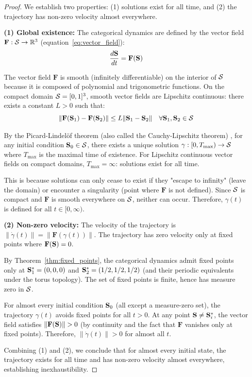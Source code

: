 \begin{proof}
We establish two properties: (1) solutions exist for all time, and (2) the trajectory has non-zero velocity almost everywhere.

\textbf{(1) Global existence:} The categorical dynamics are defined by the vector field $\mathbf{F}: \mathcal{S} \to \mathbb{R}^3$ (equation~\eqref{eq:vector_field}):
\begin{equation}
\frac{d\mathbf{S}}{dt} = \mathbf{F}(\mathbf{S})
\end{equation}

The vector field $\mathbf{F}$ is smooth (infinitely differentiable) on the interior of $\mathcal{S}$ because it is composed of polynomial and trigonometric functions. On the compact domain $\mathcal{S} = [0,1]^3$, smooth vector fields are Lipschitz continuous: there exists a constant $L > 0$ such that:
\begin{equation}
\|\mathbf{F}(\mathbf{S}_1) - \mathbf{F}(\mathbf{S}_2)\| \leq L \|\mathbf{S}_1 - \mathbf{S}_2\| \quad \forall \mathbf{S}_1, \mathbf{S}_2 \in \mathcal{S}
\end{equation}

By the Picard-Lindelöf theorem (also called the Cauchy-Lipschitz theorem) \citep{arnold1989mathematical}, for any initial condition $\mathbf{S}_0 \in \mathcal{S}$, there exists a unique solution $\gamma: [0, T_{\max}) \to \mathcal{S}$ where $T_{\max}$ is the maximal time of existence. For Lipschitz continuous vector fields on compact domains, $T_{\max} = \infty$: solutions exist for all time.

This is because solutions can only cease to exist if they "escape to infinity" (leave the domain) or encounter a singularity (point where $\mathbf{F}$ is not defined). Since $\mathcal{S}$ is compact and $\mathbf{F}$ is smooth everywhere on $\mathcal{S}$, neither can occur. Therefore, $\gamma(t)$ is defined for all $t \in [0, \infty)$.

\textbf{(2) Non-zero velocity:} The velocity of the trajectory is $\|\dot{\gamma}(t)\| = \|\mathbf{F}(\gamma(t))\|$. The trajectory has zero velocity only at fixed points where $\mathbf{F}(\mathbf{S}) = 0$.

By Theorem~\ref{thm:fixed_points}, the categorical dynamics admit fixed points only at $\mathbf{S}_1^* = (0,0,0)$ and $\mathbf{S}_2^* = (1/2, 1/2, 1/2)$ (and their periodic equivalents under the torus topology). The set of fixed points is finite, hence has measure zero in $\mathcal{S}$.

For almost every initial condition $\mathbf{S}_0$ (all except a measure-zero set), the trajectory $\gamma(t)$ avoids fixed points for all $t > 0$. At any point $\mathbf{S} \neq \mathbf{S}_i^*$, the vector field satisfies $\|\mathbf{F}(\mathbf{S})\| > 0$ (by continuity and the fact that $\mathbf{F}$ vanishes only at fixed points). Therefore, $\|\dot{\gamma}(t)\| > 0$ for almost all $t$.

Combining (1) and (2), we conclude that for almost every initial state, the trajectory exists for all time and has non-zero velocity almost everywhere, establishing inexhaustibility.
\end{proof}


